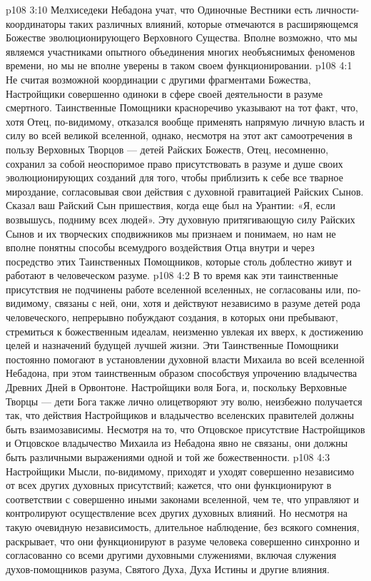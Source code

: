 \vs p108 3:10 Мелхиседеки Небадона учат, что Одиночные Вестники есть личности\hyp{}координаторы таких различных влияний, которые отмечаются в расширяющемся Божестве эволюционирующего Верховного Существа. Вполне возможно, что мы являемся участниками опытного объединения многих необъяснимых феноменов времени, но мы не вполне уверены в таком своем функционировании.
\vs p108 4:1 Не считая возможной координации с другими фрагментами Божества, Настройщики совершенно одиноки в сфере своей деятельности в разуме смертного. Таинственные Помощники красноречиво указывают на тот факт, что, хотя Отец, по\hyp{}видимому, отказался вообще применять напрямую личную власть и силу во всей великой вселенной, однако, несмотря на этот акт самоотречения в пользу Верховных Творцов --- детей Райских Божеств, Отец, несомненно, сохранил за собой неоспоримое право присутствовать в разуме и душе своих эволюционирующих созданий для того, чтобы приблизить к себе все тварное мироздание, согласовывая свои действия с духовной гравитацией Райских Сынов. Сказал ваш Райский Сын пришествия, когда еще был на Урантии: «Я, если возвышусь, подниму всех людей». Эту духовную притягивающую силу Райских Сынов и их творческих сподвижников мы признаем и понимаем, но нам не вполне понятны способы всемудрого воздействия Отца внутри и через посредство этих Таинственных Помощников, которые столь доблестно живут и работают в человеческом разуме.
\vs p108 4:2 В то время как эти таинственные присутствия не подчинены работе вселенной вселенных, не согласованы или, по\hyp{}видимому, связаны с ней, они, хотя и действуют независимо в разуме детей рода человеческого, непрерывно побуждают создания, в которых они пребывают, стремиться к божественным идеалам, неизменно увлекая их вверх, к достижению целей и назначений будущей лучшей жизни. Эти Таинственные Помощники постоянно помогают в установлении духовной власти Михаила во всей вселенной Небадона, при этом таинственным образом способствуя упрочению владычества Древних Дней в Орвонтоне. Настройщики  воля Бога, и, поскольку Верховные Творцы --- дети Бога также лично олицетворяют эту волю, неизбежно получается так, что действия Настройщиков и владычество вселенских правителей должны быть взаимозависимы. Несмотря на то, что Отцовское присутствие Настройщиков и Отцовское владычество Михаила из Небадона явно не связаны, они должны быть различными выражениями одной и той же божественности.
\vs p108 4:3 Настройщики Мысли, по\hyp{}видимому, приходят и уходят совершенно независимо от всех других духовных присутствий; кажется, что они функционируют в соответствии с совершенно иными законами вселенной, чем те, что управляют и контролируют осуществление всех других духовных влияний. Но несмотря на такую очевидную независимость, длительное наблюдение, без всякого сомнения, раскрывает, что они функционируют в разуме человека совершенно синхронно и согласованно со всеми другими духовными служениями, включая служения духов\hyp{}помощников разума, Святого Духа, Духа Истины и другие влияния.
